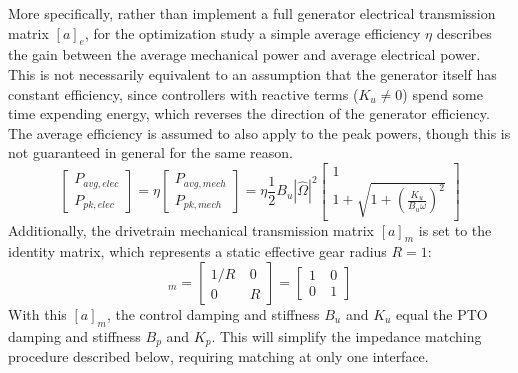 More specifically, rather than implement a full generator electrical transmission matrix $[a]_e$, for the optimization study a simple average efficiency $\eta$ describes the gain between the average mechanical power and average electrical power.
This is not necessarily equivalent to an assumption that the generator itself has constant efficiency, since controllers with reactive terms ($K_u\neq 0$) spend some time expending energy, which reverses the direction of the generator efficiency.
The average efficiency is assumed to also apply to the peak powers, though this is not guaranteed in general for the same reason.
\begin{equation}\label{eq:power-elec}
\begin{bmatrix}
P_{avg,elec} \\
P_{pk,elec}
\end{bmatrix}
= 
\eta
\begin{bmatrix}
P_{avg,mech} \\
P_{pk,mech}
\end{bmatrix}
= 
\eta \frac{1}{2} B_u |\hat{\Omega}|^2
\begin{bmatrix}
1 \\
 1 + \sqrt{1 + \left(\frac{K_u}{B_u \omega }\right) ^2  }
\end{bmatrix}
\end{equation}
Additionally, the drivetrain mechanical transmission matrix $[a]_m$ is set to the identity matrix, which represents a static effective gear radius $R=1$:
\begin{equation}
[a]_m = \begin{bmatrix}
1/R &~ 0 \\
0 &~ R
\end{bmatrix} = \begin{bmatrix}
1 &~ 0 \\
0 &~ 1
\end{bmatrix}
\end{equation}
With this $[a]_m$, the control damping and stiffness $B_u$ and $K_u$ equal the PTO damping and stiffness $B_p$ and $K_p$.
This will simplify the impedance matching procedure described below, requiring matching at only one interface.



